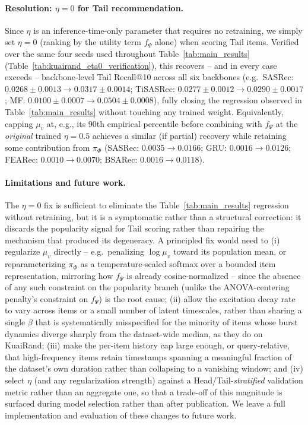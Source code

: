 \paragraph{Resolution: $\eta=0$ for Tail recommendation.} Since $\eta$ is an
inference-time-only parameter that requires no retraining, we simply set $\eta=0$
(ranking by the utility term $f_\Psi$ alone) when scoring Tail items. Verified over the
same four seeds used throughout Table~\ref{tab:main_results}
(Table~\ref{tab:kuairand_eta0_verification}), this recovers -- and in every case exceeds --
backbone-level Tail Recall@10 across all six backbones (e.g.\ SASRec:
$0.0268\pm0.0013 \to 0.0317\pm0.0014$; TiSASRec: $0.0277\pm0.0012 \to 0.0290\pm0.0017$;
MF: $0.0100\pm0.0007 \to 0.0504\pm0.0008$), fully closing the regression observed in
Table~\ref{tab:main_results} without touching any trained weight. Equivalently, capping
$\mu_v$ at, e.g., its 90th empirical percentile before combining with $f_\Psi$ at the
\emph{original} trained $\eta=0.5$ achieves a similar (if partial) recovery while
retaining some contribution from $\pi_\Phi$ (SASRec: $0.0035\to0.0166$; GRU:
$0.0016\to0.0126$; FEARec: $0.0010\to0.0070$; BSARec: $0.0016\to0.0118$).

\paragraph{Limitations and future work.} The $\eta=0$ fix is sufficient to eliminate the
Table~\ref{tab:main_results} regression without retraining, but it is a symptomatic
rather than a structural correction: it discards the popularity signal for Tail scoring
rather than repairing the mechanism that produced its degeneracy. A principled fix
would need to (i) regularize $\mu_v$ directly -- e.g.\ penalizing $\log \mu_v$ toward its
population mean, or reparameterizing $\pi_\Phi$ as a temperature-scaled softmax over a
bounded item representation, mirroring how $f_\Psi$ is already cosine-normalized -- since
the absence of any such constraint on the popularity branch (unlike the ANOVA-centering
penalty's constraint on $f_\Psi$) is the root cause; (ii) allow the excitation decay rate
to vary across items or a small number of latent timescales, rather than sharing a single
$\beta$ that is systematically misspecified for the minority of items whose burst
dynamics diverge sharply from the dataset-wide median, as they do on KuaiRand; (iii)
make the per-item history cap large enough, or query-relative, that high-frequency items
retain timestamps spanning a meaningful fraction of the dataset's own duration rather
than collapsing to a vanishing window; and (iv) select $\eta$ (and any regularization
strength) against a Head/Tail-\emph{stratified} validation metric rather than an
aggregate one, so that a trade-off of this magnitude is surfaced during model selection
rather than after publication. We leave a full implementation and evaluation of these
changes to future work.

